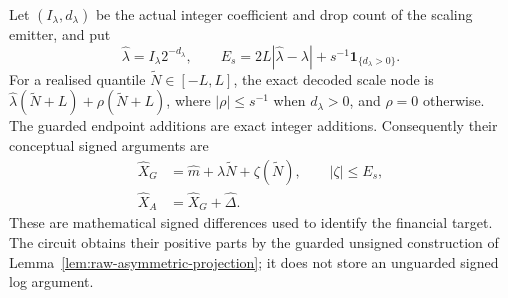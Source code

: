 \documentclass[11pt]{article}
\begin{document}
Let $(I_\lambda,d_\lambda)$ be the actual integer coefficient and
drop count of the scaling emitter, and put
\begin{equation}
 \widehat\lambda=I_\lambda2^{-d_\lambda},\qquad
 E_s=2L|\widehat\lambda-\lambda|
       +s^{-1}\mathbf1_{\{d_\lambda>0\}}.
\end{equation}
For a realised quantile $\widetilde N\in[-L,L]$, the exact decoded
scale node is
$\widehat\lambda(\widetilde N+L)+\rho(\widetilde N+L)$,
where $|\rho|\leq s^{-1}$ when $d_\lambda>0$, and $\rho=0$
otherwise. The guarded endpoint additions are exact integer additions.
Consequently their conceptual signed arguments are
\begin{align}
 \widehat X_G&=\widehat m+\lambda\widetilde N+
                    \zeta(\widetilde N),\qquad |\zeta|\leq E_s,\label{eq:raw-asymmetric-arguments}\\
 \widehat X_A&=\widehat X_G+\widehat\Delta.\nonumber
\end{align}
These are mathematical signed differences used to identify the financial
target. The circuit obtains their positive parts by the guarded unsigned
construction of Lemma~\ref{lem:raw-asymmetric-projection}; it does not
store an unguarded signed log argument.
\end{document}
